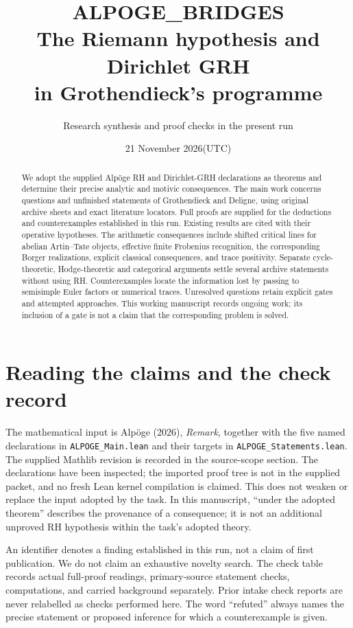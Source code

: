 \documentclass[11pt,a4paper]{article}
\title{ALPOGE\_BRIDGES\\The Riemann hypothesis and Dirichlet GRH\\in Grothendieck's programme}
\author{Research synthesis and proof checks in the present run}
\date{21 November 2026\quad\textnormal{(UTC)}}
\theoremstyle{definition}\newtheorem{definition}[theorem]{Definition}
\theoremstyle{remark}\newtheorem{remark}[theorem]{Remark}
\begin{document}
\maketitle
\begin{abstract}
We adopt the supplied Alp\"oge RH and Dirichlet-GRH declarations as
theorems and determine their precise analytic and motivic consequences.
The main work concerns questions and unfinished statements of Grothendieck
and Deligne, using original archive sheets and exact literature locators.
Full proofs are supplied for the deductions and counterexamples established
in this run. Existing results are cited with their operative hypotheses.
The arithmetic consequences include shifted critical lines for abelian
Artin--Tate objects, effective finite Frobenius recognition, the corresponding
Borger realizations, explicit classical consequences, and trace positivity.
Separate cycle-theoretic, Hodge-theoretic and categorical arguments settle
several archive statements without using RH. Counterexamples locate the
information lost by passing to semisimple Euler factors or numerical traces.
Unresolved questions retain explicit gates and attempted approaches.
This working manuscript records ongoing work; its inclusion of a gate
is not a claim that the corresponding problem is solved.
\end{abstract}

\section*{Reading the claims and the check record}
The mathematical input is Alp\"oge (2026), \emph{Remark}, together with
the five named declarations in \texttt{ALPOGE\_Main.lean} and their
targets in \texttt{ALPOGE\_Statements.lean}. The supplied Mathlib revision
is recorded in the source-scope section. The declarations have been
inspected; the imported proof tree is not in the supplied packet, and
no fresh Lean kernel compilation is claimed. This does not weaken or
replace the input adopted by the task. In this manuscript, ``under the
adopted theorem'' describes the provenance of a consequence; it is not
an additional unproved RH hypothesis within the task's adopted theory.

An identifier denotes a finding established in this run, not a claim
of first publication. We do not claim an exhaustive novelty search.
The check table records actual full-proof readings, primary-source
statement checks, computations, and carried background separately.
Prior intake check reports are never relabelled as checks performed
here. The word ``refuted'' always names the precise statement or
proposed inference for which a counterexample is given.
\end{document}
